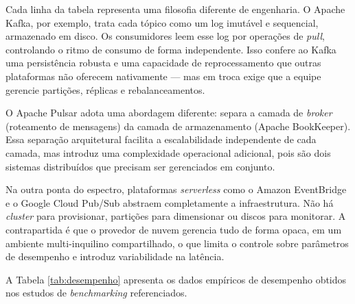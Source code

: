 \documentclass[12pt, a4paper]{article}
\begin{document}
Cada linha da tabela representa uma filosofia diferente de engenharia. O Apache Kafka, por exemplo, trata cada tópico como um log imutável e sequencial, armazenado em disco. Os consumidores leem esse log por operações de \textit{pull}, controlando o ritmo de consumo de forma independente. Isso confere ao Kafka uma persistência robusta e uma capacidade de reprocessamento que outras plataformas não oferecem nativamente --- mas em troca exige que a equipe gerencie partições, réplicas e rebalanceamentos.

O Apache Pulsar adota uma abordagem diferente: separa a camada de \textit{broker} (roteamento de mensagens) da camada de armazenamento (Apache BookKeeper). Essa separação arquitetural facilita a escalabilidade independente de cada camada, mas introduz uma complexidade operacional adicional, pois são dois sistemas distribuídos que precisam ser gerenciados em conjunto.

Na outra ponta do espectro, plataformas \textit{serverless} como o Amazon EventBridge e o Google Cloud Pub/Sub abstraem completamente a infraestrutura. Não há \textit{cluster} para provisionar, partições para dimensionar ou discos para monitorar. A contrapartida é que o provedor de nuvem gerencia tudo de forma opaca, em um ambiente multi-inquilino compartilhado, o que limita o controle sobre parâmetros de desempenho e introduz variabilidade na latência.

A Tabela \ref{tab:desempenho} apresenta os dados empíricos de desempenho obtidos nos estudos de \textit{benchmarking} referenciados.

\begin{table}[H]
\centering
\caption{Benchmarking Operacional e Parâmetros Físicos Sob Carga de Teste}
\label{tab:desempenho}
\end{table}
\end{document}
